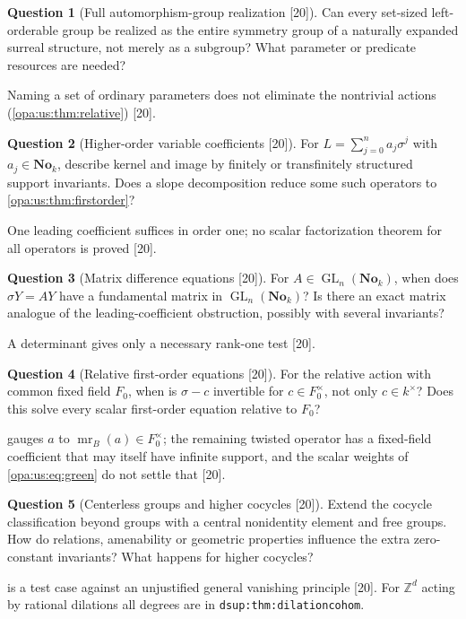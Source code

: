 \documentclass[11pt,oneside]{article}
\numberwithin{equation}{section}
\theoremstyle{definition}
\newtheorem{question}[question]{Question}
\theoremstyle{remark}
\newcommand{\No}{\mathbf{No}}
\newcommand{\Z}{\mathbb Z}
\newcommand{\GL}{\operatorname{GL}}
\newcommand{\src}[1]{\textup{\textsf{\small[#1]}}}
\newcommand{\lbl}[1]{\nolinkurl{#1}}
\begin{document}
\begin{question}[Full automorphism-group realization \src{20}]\label{opa:us:q:fullgroup}
Can every set-sized left-orderable group be realized as the entire symmetry group of a naturally expanded surreal structure, not merely as a subgroup?
What parameter or predicate resources are needed?
\end{question}
Naming a set of ordinary parameters does not eliminate the nontrivial actions (\cref{opa:us:thm:relative}) \src{20}.

\begin{question}[Higher-order variable coefficients \src{20}]\label{opa:us:q:higher}
For $L=\sum_{j=0}^na_j\sigma^j$ with $a_j\in\No_k$, describe kernel and image by finitely or transfinitely structured support invariants. Does a slope
decomposition reduce some such operators to \cref{opa:us:thm:firstorder}?
\end{question}
One leading coefficient suffices in order one; no scalar factorization theorem for all operators is proved \src{20}.

\begin{question}[Matrix difference equations \src{20}]\label{opa:us:q:matrix}
For $A\in\GL_n(\No_k)$, when does $\sigma Y=AY$ have a fundamental matrix in $\GL_n(\No_k)$? Is there an exact matrix analogue of the
leading-coefficient obstruction, possibly with several invariants?
\end{question}
A determinant gives only a necessary rank-one test \src{20}.

\begin{question}[Relative first-order equations \src{20}]\label{opa:us:q:relative}
For the relative action with common fixed field $F_0$, when is $\sigma-c$ invertible for $c\in F_0^\times$, not only $c\in k^\times$? Does this solve every
scalar first-order equation relative to $F_0$?
\end{question}
 gauges $a$ to $\operatorname{mr}_B(a)\in F_0^\times$; the remaining twisted operator has a fixed-field coefficient that may
itself have infinite support, and the scalar weights of \eqref{opa:us:eq:green} do not settle that \src{20}.

\begin{question}[Centerless groups and higher cocycles \src{20}]\label{opa:us:q:centerless}
Extend the cocycle classification beyond groups with a central nonidentity element and free groups. How do relations, amenability or geometric
properties influence the extra zero-constant invariants? What happens for higher cocycles?
\end{question}
 is a test case against an unjustified general vanishing principle \src{20}. For $\Z^d$ acting by rational dilations all
degrees are in \lbl{dsup:thm:dilationcohom}.
\end{document}
